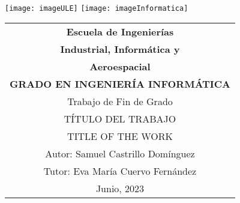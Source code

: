 \thispagestyle{empty}
\graphicspath{{./res/images/}}

\begin{table}[ht]
	\centering

	\hfill
	\\[-15ex]
	\texttt{[image: imageULE]}
	\hfill
	\texttt{[image: imageInformatica]}
	\\[25ex]

	\label{tab:coverTopCenter}
	\begin{tabular}{c}
		\LARGE\textbf{Escuela de Ingenierías}
		\\[1.5ex]

		\LARGE\textbf{Industrial, Informática y}\\
		\LARGE\textbf{Aeroespacial}
		\\[2.3ex]

		\LARGE\textbf{GRADO EN INGENIERÍA INFORMÁTICA}
		\\[10ex]

		\LARGE{Trabajo de Fin de Grado}
		\\[10ex]

		\LARGE{\uppercase{Título del trabajo}}
		\\[5ex]

		\LARGE{\uppercase{Title of the work}}
		\\[22ex]

		\hfill\large{Autor: Samuel Castrillo Domínguez}
		\\[3pt]
		\hfill\large{Tutor: Eva María Cuervo Fernández}
		\\[10ex]

		\huge{Junio, 2023}
	\end{tabular}
\end{table}
